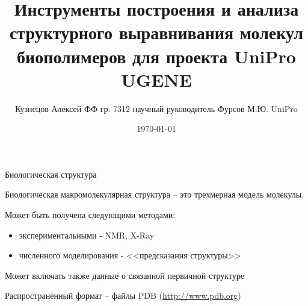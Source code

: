 \documentclass[utf8, professionalfonts]{beamer}
\title[Построение структурного выравнивания]{Инструменты построения и анализа структурного выравнивания молекул биополимеров для проекта UniPro UGENE}
\author[Кузнецов Алексей]{Кузнецов Алексей ФФ гр. 7312 \linebreak научный руководитель Фурсов М.Ю. UniPro}
\institute{Новосибирский Государственный Университет}
\date{\today}
\begin{document}
\begin{frame}
\titlepage
\end{frame}

\begin{frame}{Биологическая структура}
\begin{small}
Биологическая макромолекулярная структура -- это трехмерная модель молекулы.
\vspace{11pt}

Может быть получена следующими методами:
\begin{itemize}
        \item экспериментальными - NMR, X-Ray
        \item численного моделирования - <<предсказания структуры>>
\end{itemize}
\vspace{11pt}

Может включать также данные о связанной первичной структуре
   
\vspace{11pt}
Распространенный формат -- файлы PDB (\url{http://www.pdb.org})
\end{small}
\end{frame}
\end{document}
